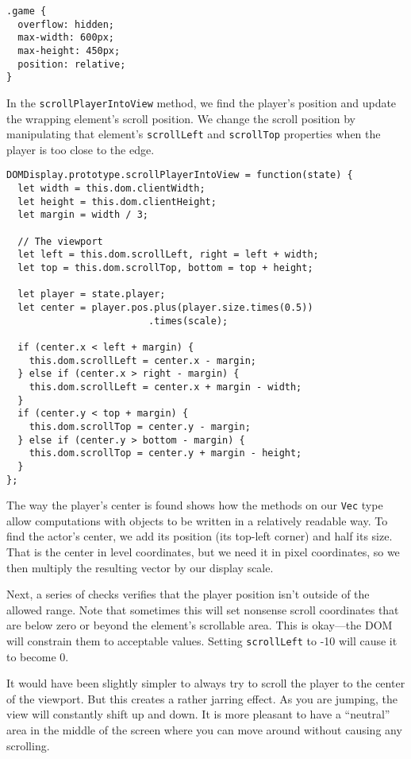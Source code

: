 \begin{lstlisting}
.game {
  overflow: hidden;
  max-width: 600px;
  max-height: 450px;
  position: relative;
}
\end{lstlisting}
\noindent{}

In the \lstinline`scrollPlayerIntoView` method, we find the player's position and update the wrapping element's scroll position. We change the scroll position by manipulating that element's \lstinline`scrollLeft` and \lstinline`scrollTop` properties when the player is too close to the edge.

\begin{lstlisting}
DOMDisplay.prototype.scrollPlayerIntoView = function(state) {
  let width = this.dom.clientWidth;
  let height = this.dom.clientHeight;
  let margin = width / 3;

  // The viewport
  let left = this.dom.scrollLeft, right = left + width;
  let top = this.dom.scrollTop, bottom = top + height;

  let player = state.player;
  let center = player.pos.plus(player.size.times(0.5))
                         .times(scale);

  if (center.x < left + margin) {
    this.dom.scrollLeft = center.x - margin;
  } else if (center.x > right - margin) {
    this.dom.scrollLeft = center.x + margin - width;
  }
  if (center.y < top + margin) {
    this.dom.scrollTop = center.y - margin;
  } else if (center.y > bottom - margin) {
    this.dom.scrollTop = center.y + margin - height;
  }
};
\end{lstlisting}
\noindent{}

The way the player's center is found shows how the methods on our \lstinline`Vec` type allow computations with objects to be written in a relatively readable way. To find the actor's center, we add its position (its top-left corner) and half its size. That is the center in level coordinates, but we need it in pixel coordinates, so we then multiply the resulting vector by our display scale.

Next, a series of checks verifies that the player position isn't outside of the allowed range. Note that sometimes this will set nonsense scroll coordinates that are below zero or beyond the element's scrollable area. This is okay—the DOM will constrain them to acceptable values. Setting \lstinline`scrollLeft` to -10 will cause it to become 0.

It would have been slightly simpler to always try to scroll the player to the center of the viewport. But this creates a rather jarring effect. As you are jumping, the view will constantly shift up and down. It is more pleasant to have a ``neutral'' area in the middle of the screen where you can move around without causing any scrolling.

